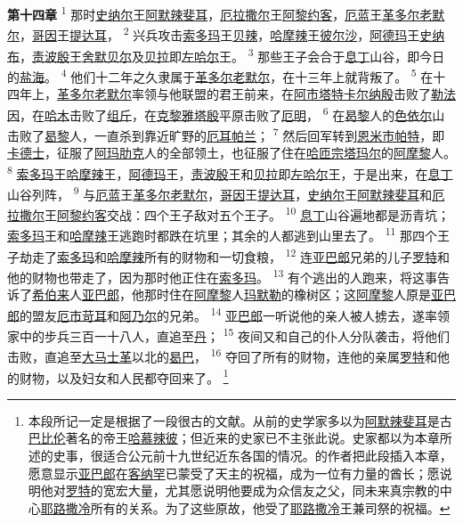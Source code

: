 \textbf{第十四章\quad}
\textsuperscript{1}
那时\uline{史纳尔}王\uline{阿默}\uline{辣斐耳}，\uline{厄拉}\uline{撒尔}王\uline{阿黎约客}，\uline{厄蓝}王\uline{革多尔}\uline{老默尔}，\uline{哥因}王\uline{提达耳}，
\textsuperscript{2}
兴兵攻击\uline{索多玛}王\uline{贝辣}，\uline{哈摩辣}王\uline{彼尔沙}，\uline{阿德玛}王\uline{史纳布}，\uline{责波殷}王\uline{舍默}\uline{贝尔}及\uline{贝拉}即\uline{左哈尔}王。
\textsuperscript{3}
那些王子会合于\uline{息丁}山谷，即今日的\uline{盐海}。
\textsuperscript{4}
他们十二年之久隶属于\uline{革多尔}\uline{老默尔}，在十三年上就背叛了。
\textsuperscript{5}
在十四年上，\uline{革多尔}\uline{老默尔}率领与他联盟的君王前来，在\uline{阿市}\uline{塔特}\uline{卡尔}\uline{纳殷}击败了\uline{勒法因}，在\uline{哈木}击败了\uline{组斤}，在\uline{克黎}\uline{雅塔殷}平原击败了\uline{厄明}，
\textsuperscript{6}
在\uline{曷黎}人的\uline{色依尔}山击败了\uline{曷黎}人，一直杀到靠近旷野的\uline{厄耳帕兰}；
\textsuperscript{7}
然后回军转到\uline{恩米市}\uline{帕特}，即\uline{卡德士}，征服了\uline{阿玛肋克}人的全部领土，也征服了住在\uline{哈匝宗}\uline{塔玛尔}的\uline{阿摩黎}人。
\textsuperscript{8}
\uline{索多玛}王\uline{哈摩辣}王，\uline{阿德玛}王，\uline{责波殷}王和\uline{贝拉}即\uline{左哈尔}王，于是出来，在\uline{息丁}山谷列阵，
\textsuperscript{9}
与\uline{厄蓝}王\uline{革多尔}\uline{老默尔}，\uline{哥因}王\uline{提达耳}，\uline{史纳尔}王\uline{阿默}\uline{辣斐耳}和\uline{厄拉}\uline{撒尔}王\uline{阿黎约客}交战：四个王子敌对五个王子。
\textsuperscript{10}
\uline{息丁}山谷遍地都是沥青坑；\uline{索多玛}王和\uline{哈摩辣}王逃跑时都跌在坑里；其余的人都逃到山里去了。
\textsuperscript{11}
那四个王子劫走了\uline{索多玛}和\uline{哈摩辣}所有的财物和一切食粮，
\textsuperscript{12}
连\uline{亚巴郎}兄弟的儿子\uline{罗特}和他的财物也带走了，因为那时他正住在\uline{索多玛}。
\textsuperscript{13}
有个逃出的人跑来，将这事告诉了\uline{希伯来}人\uline{亚巴郎}，他那时住在\uline{阿摩黎}人\uline{玛默勒}的橡树区；这\uline{阿摩黎}人原是\uline{亚巴郎}的盟友\uline{厄市}\uline{苛耳}和\uline{阿乃尔}的兄弟。
\textsuperscript{14}
\uline{亚巴郎}一听说他的亲人被人掳去，遂率领家中的步兵三百一十八人，直追至\uline{丹}；
\textsuperscript{15}
夜间又和自己的仆人分队袭击，将他们击败，直追至\uline{大马}\uline{士革}以北的\uline{曷巴}，
\textsuperscript{16}
夺回了所有的财物，连他的亲属\uline{罗特}和他的财物，以及妇女和人民都夺回来了。
\footnote{本段所记一定是根据了一段很古的文献。从前的史学家多以为\uline{阿默}\uline{辣斐耳}是古\uline{巴比伦}著名的帝王\uline{哈慕辣彼}；但近来的史家已不主张此说。史家都以为本章所述的史事，很适合公元前十九世纪近东各国的情况。的作者把此段插入本章，愿意显示\uline{亚巴郎}在\uline{客纳罕}已蒙受了天主的祝福，成为一位有力量的酋长；愿说明他对\uline{罗特}的宽宏大量，尤其愿说明他要成为众信友之父，同未来真宗教的中心\uline{耶路撒冷}所有的关系。为了这些原故，他受了\uline{耶路撒冷}王兼司祭的祝福。}

